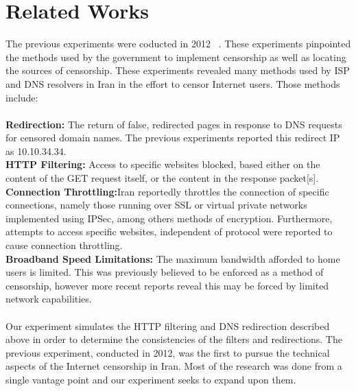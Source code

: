 \section{Related Works}\label{sec:relatedworks}

The previous experiments were coducted in 2012 ~\cite{aryan}. These experiments pinpointed the methods used by the government to implement censorship as well as locating the sources of censorship. These experiments revealed many methods used by ISP and DNS resolvers in Iran in the effort to censor Internet users. Those methods include:\\
\\
\textbf{Redirection:} The return of false, redirected pages in response to DNS requests for censored domain names. The previous experiments reported this redirect IP as 10.10.34.34.\\
\textbf{HTTP Filtering:} Access to specific websites blocked, based either on the content of the GET request itself, or the content in the response packet[s].\\
\textbf{Connection Throttling:}Iran reportedly throttles the connection of specific connections, namely those running over SSL or virtual private networks implemented using IPSec, among others methods of encryption. Furthermore, attempts to access specific websites, independent of protocol were reported to cause connection throttling.\\
\textbf{Broadband Speed Limitations:} The maximum bandwidth afforded to home user\textquotesingle s is limited. This was previously believed to be enforced as a method of censorship, however more recent reports reveal this may be forced by limited network capabilities.\\
\\
Our experiment simulates the HTTP filtering and DNS redirection described above in order to determine the consistencies of the filters and redirections. The previous experiment, conducted in 2012, was the first to pursue the technical aspects of the Internet censorship in Iran. Most of the research was done from a single vantage point and our experiment seeks to expand upon them.\\
